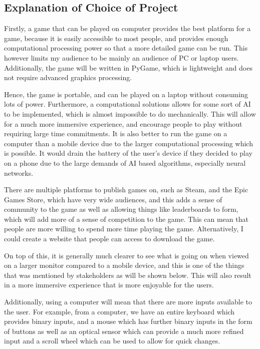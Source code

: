 \subsection{Explanation of Choice of Project}

Firstly, a game that can be played on computer provides the best platform for a game, because it is easily accessible to most people, and provides enough computational processing power so that a more detailed game can be run. This however limits my audience to be mainly an audience of PC or laptop users. Additionally, the game will be written in PyGame, which is lightweight and does not require advanced graphics processing.


\vs
Hence, the game is portable, and can be played on a laptop without consuming lots of power. Furthermore, a computational solutions allows for some sort of AI to be implemented, which is almost impossible to do mechanically. This will allow for a much more immersive experience, and encourage people to play without requiring large time commitments. It is also better to run the game on a computer than a mobile device due to the larger computational processing which is possible. It would drain the battery of the user's device if they decided to play on a phone due to the large demands of AI based algorithms, especially neural networks.


\vs
There are multiple platforms to publish games on, such as Steam, and the Epic Games Store, which have very wide audiences, and this adds a sense of community to the game as well as allowing things like leaderboards to form, which will add more of a sense of competition to the game. This can mean that people are more willing to spend more time playing the game. Alternatively, I could create a website that people can access to download the game.

\vs
On top of this, it is generally much clearer to see what is going on when viewed on a larger monitor compared to a mobile device, and this is one of the things that was mentioned by stakeholders as will be shown below. This will also result in a more immersive experience that is more enjoyable for the users.

\vs
Additionally, using a computer will mean that there are more inputs available to the user. For example, from a computer, we have an entire keyboard which provides binary inputs, and a mouse which has further binary inputs in the form of buttons as well as an optical sensor which can provide a much more refined input and a scroll wheel which can be used to allow for quick changes.

